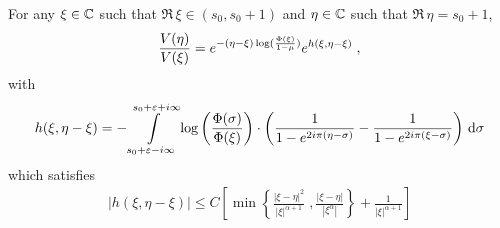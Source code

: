 \begin{lemma}
\label{eq:ARMA_C6}
   For any $\xi \in \mathbb{C}$ such that $\Re \,\xi\in (s_0, s_0+1)$ and $\eta \in \mathbb{C}$ such that $\Re \, \eta = s_0+1$,
\begin{equation}
    \label{eq:ARMAC.25}
    \frac{V(\eta)}{V(\xi)} 
    = e^{-(\eta-\xi) \log(\frac{\Phi(\xi)}{1-\mu})}e^{h(\xi, \eta-\xi)}
    \; ,
\end{equation}
with 
\begin{equation*}
    h(\xi, \eta-\xi) =    - \int\limits_{s_0+\varepsilon-i\infty}^{s_0+\varepsilon+i\infty}
    \log \left( \frac{\Phi(\sigma)}{\Phi(\xi)}\right)
    \cdot 
    \left(
        \frac{1}{1-e^{2i\pi(\eta-\sigma)}} - \frac{1}{1-e^{2i\pi(\xi-\sigma)}}
     \right) \,\mathrm{d} \sigma 
\end{equation*}
which satisfies 
\begin{align*}
    |h(\xi, \eta-\xi)| \leq C \left[\min \left\{ \frac{|\xi - \eta|^2}{|\xi|^{\alpha+1}} \;, \frac{|\xi-\eta|}{|\xi^{\alpha}|}\right\} + \frac{1}{|\xi|^{\alpha+1}} \right]
\end{align*}
\end{lemma}
